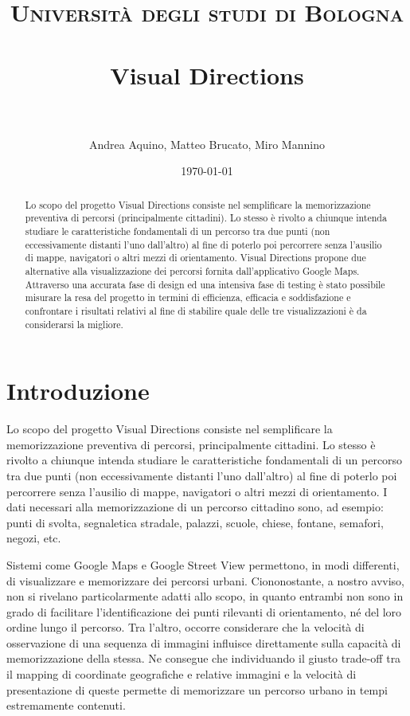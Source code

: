 \documentclass[12pt,a4paper,openright, notitlepage]{report}
\title{	
\normalfont \normalsize 
\textsc{Università degli studi di Bologna} \\ [25pt]
\horrule{0.5pt} \\[0.4cm]
\huge Visual Directions \\
\horrule{2pt} \\[0.5cm]
}
\author{Andrea Aquino, Matteo Brucato, Miro Mannino}
\date{\normalsize\today}
\begin{document}
\maketitle

\begin{abstract}
Lo scopo del progetto Visual Directions consiste nel semplificare la memorizzazione preventiva di percorsi (principalmente cittadini). Lo stesso è rivolto a chiunque intenda studiare le caratteristiche fondamentali di un percorso tra due punti (non eccessivamente distanti l’uno dall’altro) al fine di poterlo poi percorrere senza l’ausilio di mappe, navigatori o altri mezzi di orientamento. Visual Directions propone due alternative alla visualizzazione dei percorsi fornita dall’applicativo Google Maps. Attraverso una accurata fase di design ed una intensiva fase di testing è stato possibile misurare la resa del progetto in termini di efficienza, efficacia e soddisfazione e confrontare i risultati relativi al fine di stabilire quale delle tre visualizzazioni è da considerarsi la migliore.
\end{abstract}


\chapter{Introduzione}

Lo scopo del progetto Visual Directions consiste nel semplificare la memorizzazione preventiva di percorsi, principalmente cittadini. Lo stesso è rivolto a chiunque intenda studiare le caratteristiche fondamentali di un percorso tra due punti (non eccessivamente distanti l’uno dall’altro) al fine di poterlo poi percorrere senza l’ausilio di mappe, navigatori o altri mezzi di orientamento. I dati necessari alla memorizzazione di un percorso cittadino sono, ad esempio: punti di svolta, segnaletica stradale, palazzi, scuole, chiese, fontane, semafori, negozi, etc. 

Sistemi come Google Maps e Google Street View permettono, in modi differenti, di visualizzare e memorizzare dei percorsi urbani. Ciononostante, a nostro avviso, non si rivelano particolarmente adatti allo scopo, in quanto entrambi non sono in grado di facilitare l’identificazione dei punti rilevanti di orientamento, né del loro ordine lungo il percorso. Tra l’altro, occorre considerare che la velocità di osservazione di una sequenza di immagini influisce direttamente sulla capacità di memorizzazione della stessa. Ne consegue che individuando il giusto trade-off tra il mapping di coordinate geografiche e relative immagini e la velocità di presentazione di queste permette di memorizzare un percorso urbano in tempi estremamente contenuti.
\end{document}
